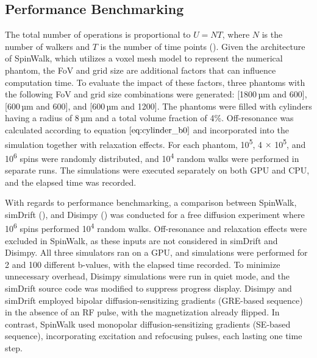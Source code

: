 \subsection*{Performance Benchmarking}

The total number of operations is proportional to \(U = NT\), where \(N\) is the number of walkers and \(T\) is the number of time points (\cite{hall2009convergence}). Given the architecture of SpinWalk, which utilizes a voxel mesh model to represent the numerical phantom, the FoV and grid size are additional factors that can influence computation time. To evaluate the impact of these factors, three phantoms with the following FoV and grid size combinations were generated: [1800\,µm and 600], [600\,µm and 600], and [600\,µm and 1200]. The phantoms were filled with cylinders having a radius of 8\,µm and a total volume fraction of 4\%. Off-resonance was calculated according to equation \(\eqref{eq:cylinder_b0}\) and incorporated into the simulation together with relaxation effects. For each phantom, 10\textsuperscript{5}, 4 \(\times\) 10\textsuperscript{5}, and 10\textsuperscript{6} spins were randomly distributed, and 10\textsuperscript{4} random walks were performed in separate runs. The simulations were executed separately on both GPU and CPU, and the elapsed time was recorded.

With regards to performance benchmarking, a comparison between SpinWalk, simDrift (\cite{blum2023simulated}), and Disimpy (\cite{kerkela2020disimpy}) was conducted for a free diffusion experiment where 10\textsuperscript{6} spins performed 10\textsuperscript{4} random walks. Off-resonance and relaxation effects were excluded in SpinWalk, as these inputs are not considered in simDrift and Disimpy. All three simulators ran on a GPU, and simulations were performed for 2 and 100 different b-values, with the elapsed time recorded. To minimize unnecessary overhead, Disimpy simulations were run in quiet mode, and the simDrift source code was modified to suppress progress display. Disimpy and simDrift employed bipolar diffusion-sensitizing gradients (GRE-based sequence) in the absence of an RF pulse, with the magnetization already flipped. In contrast, SpinWalk used monopolar diffusion-sensitizing gradients (SE-based sequence), incorporating excitation and refocusing pulses, each lasting one time step.
 
